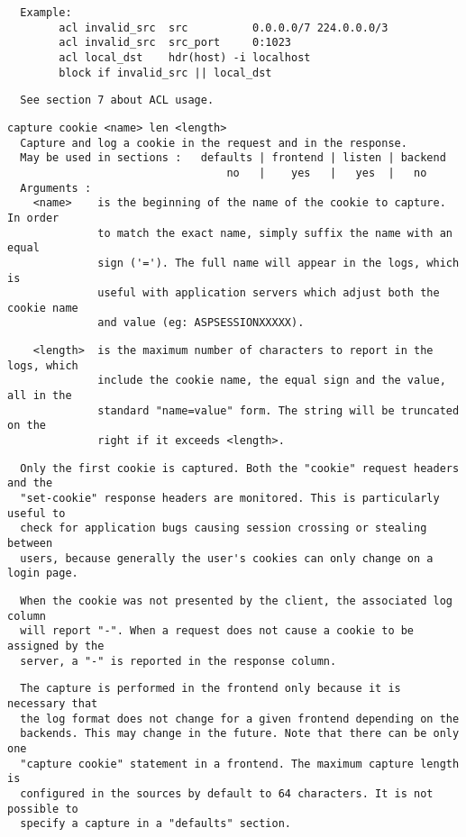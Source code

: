 \begin{verbatim}
  Example:
        acl invalid_src  src          0.0.0.0/7 224.0.0.0/3
        acl invalid_src  src_port     0:1023
        acl local_dst    hdr(host) -i localhost
        block if invalid_src || local_dst
\end{verbatim}

\begin{verbatim}
  See section 7 about ACL usage.
\end{verbatim}

\begin{verbatim}
capture cookie <name> len <length>
  Capture and log a cookie in the request and in the response.
  May be used in sections :   defaults | frontend | listen | backend
                                  no   |    yes   |   yes  |   no
  Arguments :
    <name>    is the beginning of the name of the cookie to capture. In order
              to match the exact name, simply suffix the name with an equal
              sign ('='). The full name will appear in the logs, which is
              useful with application servers which adjust both the cookie name
              and value (eg: ASPSESSIONXXXXX).
\end{verbatim}

\begin{verbatim}
    <length>  is the maximum number of characters to report in the logs, which
              include the cookie name, the equal sign and the value, all in the
              standard "name=value" form. The string will be truncated on the
              right if it exceeds <length>.
\end{verbatim}

\begin{verbatim}
  Only the first cookie is captured. Both the "cookie" request headers and the
  "set-cookie" response headers are monitored. This is particularly useful to
  check for application bugs causing session crossing or stealing between
  users, because generally the user's cookies can only change on a login page.
\end{verbatim}

\begin{verbatim}
  When the cookie was not presented by the client, the associated log column
  will report "-". When a request does not cause a cookie to be assigned by the
  server, a "-" is reported in the response column.
\end{verbatim}

\begin{verbatim}
  The capture is performed in the frontend only because it is necessary that
  the log format does not change for a given frontend depending on the
  backends. This may change in the future. Note that there can be only one
  "capture cookie" statement in a frontend. The maximum capture length is
  configured in the sources by default to 64 characters. It is not possible to
  specify a capture in a "defaults" section.
\end{verbatim}

